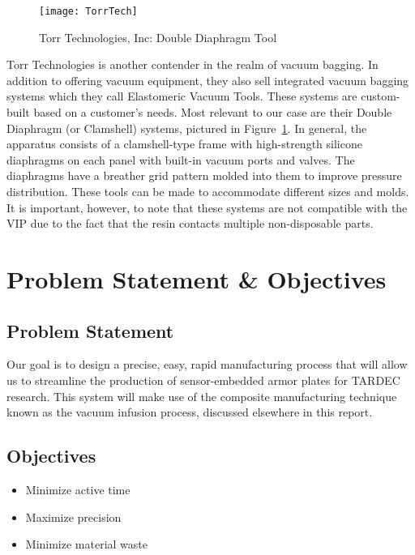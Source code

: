 \documentclass[12pt,letterpaper,notitlepage]{article}
\begin{document}
\begin{figure}
\centering
\texttt{[image: TorrTech]}
\label{fig:TorrTech}
\caption{Torr Technologies, Inc: Double Diaphragm Tool}
\end{figure}
Torr Technologies is another contender in the realm of vacuum bagging. In addition to offering vacuum equipment, they also sell integrated vacuum bagging systems which they call Elastomeric Vacuum Tools. These systems are custom-built based on a customer’s needs. Most relevant to our case are their Double Diaphragm (or Clamshell) systems, pictured in Figure~\ref{fig:TorrTech}. In general, the apparatus consists of a clamshell-type frame with high-strength silicone diaphragms on each panel with built-in vacuum ports and valves. The diaphragms have a breather grid pattern molded into them to improve pressure distribution. These tools can be made to accommodate different sizes and molds. It is important, however, to note that these systems are not compatible with the VIP due to the fact that the resin contacts multiple non-disposable parts.

\section{Problem Statement \& Objectives}
\subsection{Problem Statement}
Our goal is to design a precise, easy, rapid manufacturing process that will allow us to streamline the production of sensor-embedded armor plates for TARDEC research. This system will make use of the composite manufacturing technique known as the vacuum infusion process, discussed elsewhere in this report.
\subsection{Objectives}
\begin{itemize}
\item Minimize active time
\item Maximize precision
\item Minimize material waste
\end{itemize}
\end{document}
